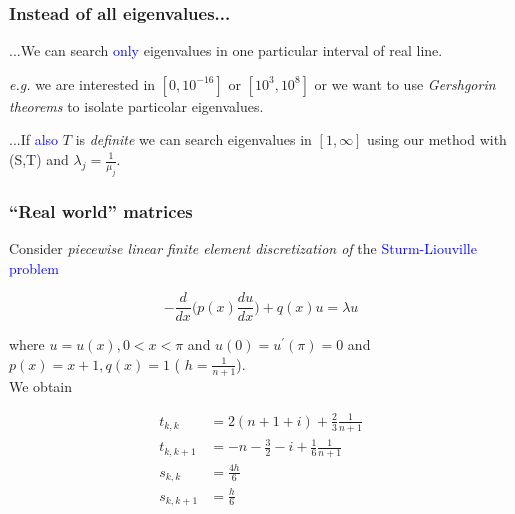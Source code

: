 \documentclass{beamer}
\theoremstyle{definition} \newtheorem{de}{Def}
\theoremstyle{remark} \newtheorem{os}[de]{Remark}
\theoremstyle{plain} \newtheorem{te}[de]{Teo}
\theoremstyle{plain} \newtheorem{co}[de]{Cor}
\theoremstyle{plain} \newtheorem{pr}[de]{Prop}
\theoremstyle{plain} \newtheorem{lem}[de]{Lemm}
\theoremstyle{remark} \newtheorem{rem}[de]{Remark}
\begin{document}
\begin{frame}
  \frametitle{Instead of all eigenvalues...}

  ...We can search \textcolor{blue}{only} eigenvalues in one particular interval of real line.

  \pause

  \emph{e.g.} we are interested in $[0,10^{-16}]$ or $[10^{3},10^{8}]$ or we want to use \emph{Gershgorin theorems} to isolate particolar eigenvalues.

  \pause

  ...If \textcolor{blue}{also} $T$ is \emph{definite} we can search eigenvalues in $[1,\infty]$ using our method with (S,T) and $\lambda_j=\frac{1}{\mu_j}$.

\end{frame}

\begin{frame}
  \frametitle{``Real world'' matrices}

  Consider \emph{piecewise linear finite element discretization of} the \textcolor{blue}{Sturm-Liouville problem}

  \begin{equation*}
    - \frac{d}{d x}\Big( p(x) \frac{d u}{d x} \Big) + q(x) u = \lambda u
  \end{equation*}

  where $u=u(x),0<x<\pi$ and $u(0)=u^{'}(\pi)=0$ and $p(x)=x+1,q(x)=1$ ( $h=\frac{1}{n+1}$). \\
  We obtain
  

  \begin{align*}
    t_{k,k} &= 2(n+1+i) + \frac{2}{3}\frac{1}{n+1}\\
    t_{k,k+1} &= -n -\frac{3}{2}-i+\frac{1}{6}\frac{1}{n+1}\\
    s_{k,k} &= \frac{4 h}{6}\\
    s_{k,k+1} &= \frac{h}{6}
  \end{align*}

\end{frame}
\end{document}
